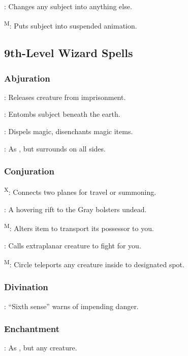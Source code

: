 	: Changes any subject into anything else.

	\textsuperscript{M}: Puts subject into suspended animation.




\subsection{9th-Level Wizard Spells}

\subsubsection{Abjuration}
	: Releases creature from imprisonment.

	: Entombs subject beneath the earth.

	: Dispels magic, disenchants magic items.

	: As , but surrounds on all sides.

\subsubsection{Conjuration}
	\textsuperscript{X}: Connects two planes for travel or summoning.

	: A hovering rift to the Gray bolsters undead. %

	\textsuperscript{M}: Alters item to transport its possessor to you.

	: Calls extraplanar creature to fight for you.

	\textsuperscript{M}: Circle teleports any creature inside to designated spot.

\subsubsection{Divination}
	: ``Sixth sense'' warns of impending danger.

\subsubsection{Enchantment}
	: As , but any creature.

